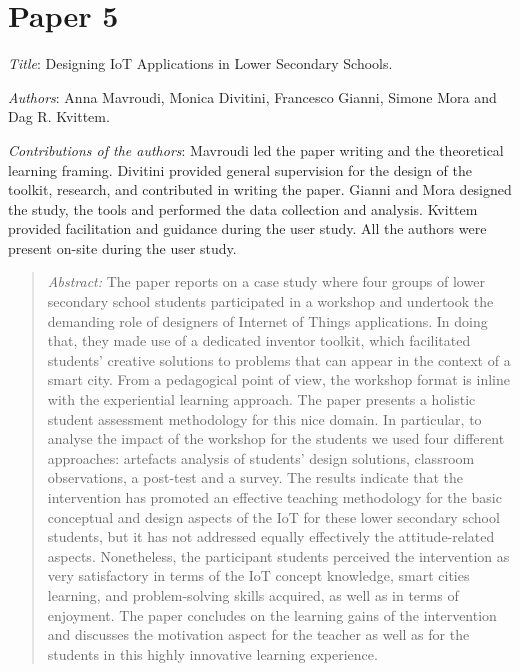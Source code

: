 \section[P5: Designing IoT Applications in Lower Secondary Schools.][Paper 5]{Paper 5}
\label{paper-5}

\emph{Title}: Designing IoT Applications in Lower Secondary Schools.

\emph{Authors}: Anna Mavroudi, Monica Divitini, Francesco Gianni, Simone Mora and Dag R. Kvittem.

\emph{Contributions of the authors}: Mavroudi led the paper writing and the theoretical learning framing. Divitini provided general supervision for the design of the toolkit, research, and contributed in writing the paper. Gianni and Mora designed the study, the tools and performed the data collection and analysis. Kvittem provided facilitation and guidance during the user study. All the authors were present on-site during the user study.

\begin{quote}
	\emph{Abstract:} The paper reports on a case study where four groups of lower secondary school students participated in a workshop and undertook the demanding role of designers of Internet of Things applications. In doing that, they made use of a dedicated inventor toolkit, which facilitated students’ creative solutions to problems that can appear in the context of a smart city. From a pedagogical point of view, the workshop format is inline with the experiential learning approach. The paper presents a holistic student assessment methodology for this nice domain. In particular, to analyse the impact of the workshop for the students we used four different approaches: artefacts analysis of students’ design solutions, classroom observations, a post-test and a survey. The results indicate that the intervention has promoted an effective teaching methodology for the basic conceptual and design aspects of the IoT for these lower secondary school students, but it has not addressed equally effectively the attitude-related aspects. Nonetheless, the participant students perceived the intervention as very satisfactory in terms of the IoT concept knowledge, smart cities learning, and problem-solving skills acquired, as well as in terms of enjoyment. The paper concludes on the learning gains of the intervention and discusses the motivation aspect for the teacher as well as for the students in this highly innovative learning experience.
\end{quote}

